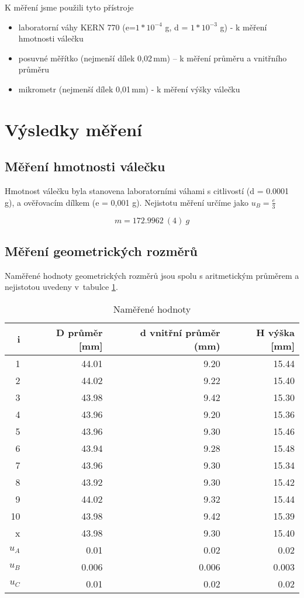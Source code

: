 \documentclass[a4paper,11pt]{article}
\begin{document}
K měření jsme použili tyto přístroje
\begin{itemize}
  \item laboratorní váhy KERN 770 (e=$1 * 10 ^ {-4}$ g, d =  $1 * 10^{-3}$ g) - k měření hmotnosti válečku
    \item posuvné měřítko (nejmenší dílek 0,02\,mm) -- k měření průměru a vnitřního průměru
    \item mikrometr (nejmenší dílek 0,01\,mm) - k měření výšky válečku
\end{itemize}

\section{Výsledky měření}

\subsection{Měření hmotnosti válečku}
Hmotnost válečku byla stanovena laboratorními váhami s citlivostí (d = 0.0001 g), 
a ověřovacím dílkem (e = 0,001 g). Nejistotu měření určíme jako $u_B = \frac{e}{3}$

\begin{equation}
m = 172.9962\ (4)\ g
\end{equation}

\subsection{Měření geometrických rozměrů}
Naměřené hodnoty geometrických rozměrů jsou spolu s aritmetickým průměrem a nejistotou uvedeny v~tabulce \ref{tb:mer}.


\begin{table}[ht]
\centering
\begin{tabular}{| r | r | r | r |}
\hline
i & D průměr [mm] & d vnitřní průměr (mm) & H výška [mm] \\
\hline\hline
1 & 44.01 & 9.20 & 15.44 \\
2 & 44.02 & 9.22 & 15.40 \\
3 & 43.98 & 9.42 & 15.30 \\
4 & 43.96 & 9.20 & 15.36 \\
5 & 43.96 & 9.30 & 15.46 \\
6 & 43.94 & 9.28 & 15.48 \\
7 & 43.96 & 9.30 & 15.34 \\
8 & 43.92 & 9.30 & 15.42 \\
9 & 44.02 & 9.32 & 15.44 \\
10 & 43.98 & 9.42 & 15.39 \\
\hline\hline
x & 43.98 & 9.30 & 15.40 \\\hline
$u_A$ & 0.01 & 0.02 & 0.02 \\\hline
$u_B$ & 0.006 & 0.006 & 0.003 \\\hline
$u_C$ & 0.01 & 0.02 & 0.02\\\hline
\end{tabular}
\caption{Naměřené hodnoty} 
\label{tb:mer}
\end{table}
\end{document}
